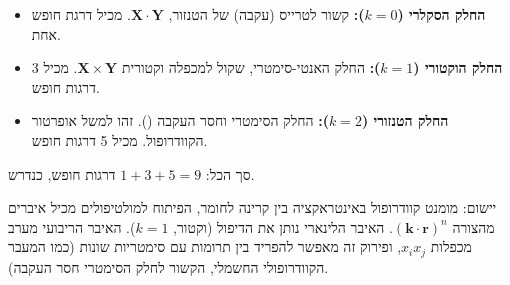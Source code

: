 \begin{itemize}
    \item \textbf{החלק הסקלרי ($k=0$):} קשור לטרייס (עקבה) של הטנזור, $\mathbf{X}\cdot\mathbf{Y}$. מכיל דרגת חופש אחת.
    \item \textbf{החלק הוקטורי ($k=1$):} החלק האנטי-סימטרי, שקול למכפלה וקטורית $\mathbf{X} \times \mathbf{Y}$. מכיל 3 דרגות חופש.
    \item \textbf{החלק הטנזורי ($k=2$):} החלק הסימטרי וחסר העקבה (). זהו למשל אופרטור הקוודרופול. מכיל 5 דרגות חופש.
\end{itemize}

סך הכל: $1 + 3 + 5 = 9$ דרגות חופש, כנדרש.

\begin{examplebox}{יישום: מומנט קוודרופול}
באינטראקציה בין קרינה לחומר, הפיתוח למולטיפולים מכיל איברים מהצורה $(\mathbf{k}\cdot\mathbf{r})^n$. האיבר הלינארי נותן את הדיפול (וקטור, $k=1$). האיבר הריבועי מערב מכפלות $x_i x_j$, ופירוק זה מאפשר להפריד בין תרומות עם סימטריות שונות (כמו המעבר הקוודרופולי החשמלי, הקשור לחלק הסימטרי חסר העקבה).
\end{examplebox}